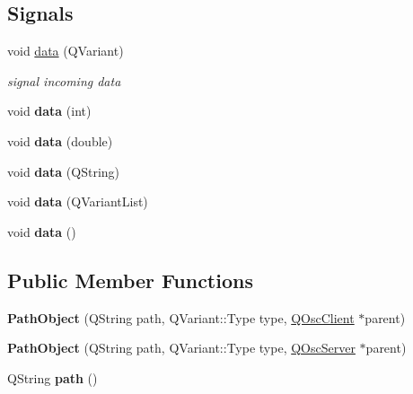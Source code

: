 \subsection*{Signals}
\textbf{ }\par
\begin{DoxyCompactItemize}
\item 
\mbox{\label{class_path_object_a72f766107dc715e9957030732c96cc3b}} 
void \hyperlink{class_path_object_a72f766107dc715e9957030732c96cc3b}{data} (Q\+Variant)
\begin{DoxyCompactList}\small\item\em signal incoming data \end{DoxyCompactList}\item 
\mbox{\label{class_path_object_ae0a88ac7f030d64e96f8a743d033e30f}} 
void {\bfseries data} (int)
\item 
\mbox{\label{class_path_object_a5879fb9d1d49b06de32db030a5d8db47}} 
void {\bfseries data} (double)
\item 
\mbox{\label{class_path_object_aa8f75d47deb20064cad27fd02a817b4a}} 
void {\bfseries data} (Q\+String)
\item 
\mbox{\label{class_path_object_a927295b4ecc6e72aef3c42e0304fda82}} 
void {\bfseries data} (Q\+Variant\+List)
\item 
\mbox{\label{class_path_object_a8d6b7854dce273ba8b2b6d4f8f72a928}} 
void {\bfseries data} ()
\end{DoxyCompactItemize}

\subsection*{Public Member Functions}
\begin{DoxyCompactItemize}
\item 
\mbox{\label{class_path_object_ad663c314b5f85b861610c2536c131727}} 
{\bfseries Path\+Object} (Q\+String path, Q\+Variant\+::\+Type type, \hyperlink{class_q_osc_client}{Q\+Osc\+Client} $\ast$parent)
\item 
\mbox{\label{class_path_object_a943ebcb54490dc73a1f0778533451029}} 
{\bfseries Path\+Object} (Q\+String path, Q\+Variant\+::\+Type type, \hyperlink{class_q_osc_server}{Q\+Osc\+Server} $\ast$parent)
\item 
\mbox{\label{class_path_object_a529482437e3749d98ef7afcc64c30391}} 
Q\+String {\bfseries path} ()
\end{DoxyCompactItemize}
